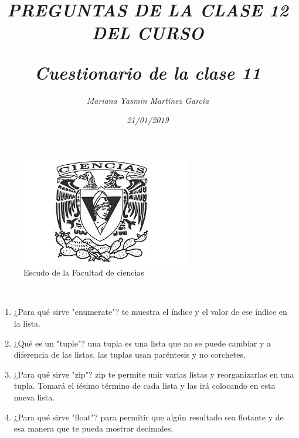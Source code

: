 \documentclass{article}
\title{\Huge\item\color{magenta}\textit{PREGUNTAS DE LA CLASE 12 DEL CURSO}}
\author{\Large\textit{Mariana Yasmin Martínez García}}
\date{\Large\textit{21/01/2019}}
\begin{document}
\begin{figure}[t]
	\centering
	\includegraphics[width=0.7\linewidth]{Imagenes/1}
	\caption{Escudo de la Facultad de ciencias}
	\label{figura:1}
\end{figure}

	\maketitle
		
	\newpage
	
	\title{\huge\color{magenta}\textbf{\textit{Cuestionario de la clase 11}}} \\
	\begin{enumerate}
		 \item{\Large\color{purple} ¿Para qué sirve "enumerate"?} te muestra el índice y el valor de ese índice en la lista.
		 \item{\Large\color{purple} ¿Qué es un "tuple"?} una tupla es una lista que no se puede cambiar y a diferencia de las listas, las tuplas usan paréntesis y no corchetes.
		 \item{\Large\color{purple} ¿Para qué sirve "zip"?} zip te permite unir varias listas y reorganizarlas en una tupla. Tomará el iésimo término  de cada lista y las irá colocando en esta nueva lista.
		 \item{\Large\color{purple} ¿Para qué sirve "float"?} para permitir que algún resultado sea flotante y de esa manera que te pueda mostrar decimales.
	\end{enumerate}
	
\end{document}
